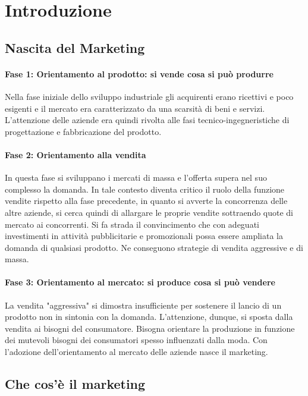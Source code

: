\chapter{Introduzione}
\section{Nascita del Marketing}
\subsubsection*{Fase 1: Orientamento al prodotto: si vende cosa si può produrre}
Nella fase iniziale dello sviluppo industriale gli acquirenti erano ricettivi e poco esigenti e il mercato era caratterizzato da una scarsità di beni e servizi. L'attenzione delle aziende era quindi rivolta alle fasi tecnico-ingegneristiche di progettazione e fabbricazione del prodotto.

\subsubsection*{Fase 2: Orientamento alla vendita}
In questa fase si sviluppano i mercati di massa e l'offerta supera nel suo complesso la domanda. In tale contesto diventa critico il ruolo della funzione vendite rispetto alla fase precedente, in quanto si avverte la concorrenza delle altre aziende, si cerca quindi di allargare le proprie vendite sottraendo quote di mercato ai concorrenti. \newline
Si fa strada il convincimento che con adeguati investimenti in attività pubblicitarie e promozionali possa essere ampliata la domanda di qualsiasi prodotto. Ne conseguono strategie di vendita aggressive e di massa.

\subsubsection*{Fase 3: Orientamento al mercato: si produce cosa si può vendere}
La vendita "aggressiva" si dimostra insufficiente per sostenere il lancio di un prodotto non in sintonia con la domanda. L'attenzione, dunque, si sposta dalla vendita ai bisogni del consumatore. Bisogna orientare la produzione in funzione dei mutevoli bisogni dei consumatori spesso influenzati dalla moda.\newline
Con l'adozione dell'orientamento al mercato delle aziende nasce il marketing.

\section{Che cos'è il marketing}
